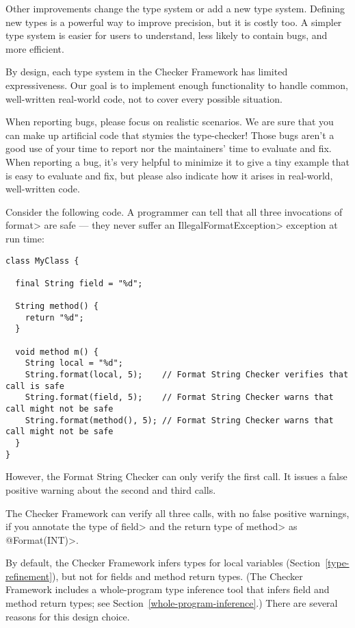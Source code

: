 Other improvements change the type system or add a new type system.
Defining new types is a powerful way to improve precision, but it is costly
too.  A simpler type system is easier for users to understand, less likely
to contain bugs, and more efficient.

By design, each type system in the Checker Framework has limited
expressiveness.  Our goal is to implement enough functionality to handle
common, well-written real-world code, not to cover every possible
situation.

When reporting bugs, please focus on realistic scenarios.  We are sure that
you can make up artificial code that stymies the type-checker!  Those bugs
aren't a good use of your time to report nor the maintainers' time to
evaluate and fix.  When reporting a bug, it's very helpful to minimize it
to give a tiny example that is easy to evaluate and fix, but please also
indicate how it arises in real-world, well-written code.



Consider the following code.  A programmer can tell that all three
invocations of \<format> are safe --- they never suffer an
\<IllegalFormatException> exception at run time:

\begin{Verbatim}
class MyClass {

  final String field = "%d";

  String method() {
    return "%d";
  }

  void method m() {
    String local = "%d";
    String.format(local, 5);    // Format String Checker verifies that call is safe
    String.format(field, 5);    // Format String Checker warns that call might not be safe
    String.format(method(), 5); // Format String Checker warns that call might not be safe
  }
}
\end{Verbatim}

\noindent
However, the Format String Checker can only verify the first call.  It issues a
false positive warning about the second and third calls.

The Checker Framework can verify all three calls, with no false positive
warnings, if you annotate the type of \<field> and the return type of
\<method> as \<@Format(INT)>.

By default, the Checker Framework infers types for local variables
(Section~\ref{type-refinement}), but not for fields and method return
types.  (The Checker Framework includes a whole-program type inference tool
that infers field and method return types; see
Section~\ref{whole-program-inference}.)
There are several reasons for this design choice.

